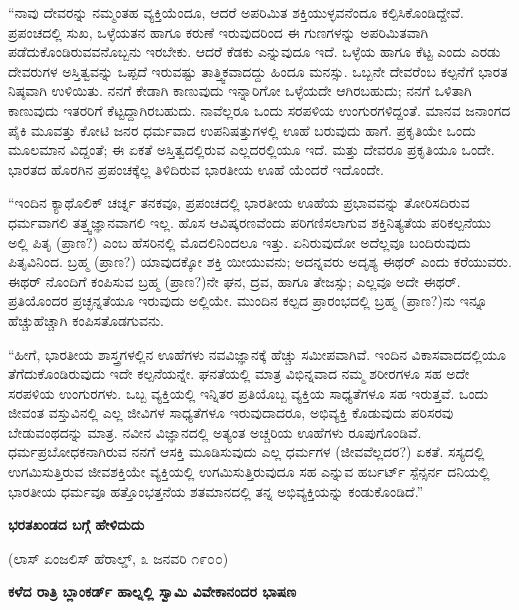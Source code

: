 “ನಾವು ದೇವರನ್ನು ನಮ್ಮಂತಹ ವ್ಯಕ್ತಿಯೆಂದೂ, ಆದರೆ ಅಪರಿಮಿತ ಶಕ್ತಿಯುಳ್ಳವನೆಂದೂ ಕಲ್ಪಿಸಿಕೊಂಡಿದ್ದೇವೆ. ಪ್ರಪಂಚದಲ್ಲಿ ಸುಖ, ಒಳ್ಳೆಯತನ ಹಾಗೂ ಕರುಣೆ ಇರುವುದರಿಂದ ಈ ಗುಣಗಳನ್ನು ಅಪರಿಮಿತವಾಗಿ ಪಡೆದುಕೊಂಡಿರುವವನೊಬ್ಬನು ಇರಬೇಕು. ಆದರೆ ಕೆಡಕು ಎನ್ನುವುದೂ ಇದೆ. ಒಳ್ಳೆಯ ಹಾಗೂ ಕೆಟ್ಟ ಎಂದು ಎರಡು ದೇವರುಗಳ ಅಸ್ತಿತ್ವವನ್ನು ಒಪ್ಪದೆ ಇರುವಷ್ಟು ತಾತ್ತ್ವಿಕವಾದದ್ದು ಹಿಂದೂ ಮನಸ್ಸು. ಒಬ್ಬನೇ ದೇವರೆಂಬ ಕಲ್ಪನೆಗೆ ಭಾರತ ನಿಷ್ಠವಾಗಿ ಉಳಿಯಿತು. ನನಗೆ ಕೇಡಾಗಿ ಕಾಣುವುದು ಇನ್ನಾರಿಗೋ ಒಳ್ಳೆಯದೇ ಆಗಿರಬಹುದು; ನನಗೆ ಒಳಿತಾಗಿ ಕಾಣುವುದು ಇತರರಿಗೆ ಕೆಟ್ಟದ್ದಾಗಿರಬಹುದು. ನಾವೆಲ್ಲರೂ ಒಂದು ಸರಪಳಿಯ ಉಂಗುರಗಳಿದ್ದಂತೆ. ಮಾನವ ಜನಾಂಗದ ಪೈಕಿ ಮೂವತ್ತು ಕೋಟಿ ಜನರ ಧರ್ಮವಾದ ಉಪನಿಷತ್ತುಗಳಲ್ಲಿ ಊಹೆ ಬರುವುದು ಹಾಗೆ. ಪ್ರಕೃತಿಯೇ ಒಂದು ಮೂಲಮಾನ ವಿದ್ದಂತೆ; ಈ ಏಕತೆ ಅಸ್ತಿತ್ವದಲ್ಲಿರುವ ಎಲ್ಲದರಲ್ಲಿಯೂ ಇದೆ. ಮತ್ತು ದೇವರೂ ಪ್ರಕೃತಿಯೂ ಒಂದೇ. ಭಾರತದ ಹೊರಗಿನ ಪ್ರಪಂಚಕ್ಕೆಲ್ಲ ತಿಳಿದಿರುವ ಭಾರತೀಯ ಊಹೆ ಯೆಂದರೆ ಇದೊಂದೇ.

“ಇಂದಿನ ಕ್ಯಾಥೊಲಿಕ್ ಚರ್ಚ್ನ ತನಕವೂ, ಪ್ರಪಂಚದಲ್ಲಿ ಭಾರತೀಯ ಊಹೆಯ ಪ್ರಭಾವವನ್ನು ತೋರಿಸದಿರುವ ಧರ್ಮವಾಗಲಿ ತತ್ತ್ವಜ್ಞಾನವಾಗಲಿ ಇಲ್ಲ. ಹೊಸ ಆವಿಷ್ಕರಣವೆಂದು ಪರಿಗಣಿಸಲಾಗುವ ಶಕ್ತಿನಿತ್ಯತೆಯ ಪರಿಕಲ್ಪನೆಯು ಅಲ್ಲಿ ಪಿತೃ (ಪ್ರಾಣ?) ಎಂಬ ಹೆಸರಿನಲ್ಲಿ ಮೊದಲಿನಿಂದಲೂ ಇತ್ತು. ಏನಿರುವುದೋ ಅದೆಲ್ಲವೂ ಬಂದಿರುವುದು ಪಿತೃವಿನಿಂದ. ಬ್ರಹ್ಮ (ಪ್ರಾಣ?) ಯಾವುದಕ್ಕೋ ಶಕ್ತಿ ಯೀಯುವನು; ಅದನ್ನವರು ಅದೃಶ್ಯ ಈಥರ್ ಎಂದು ಕರೆಯುವರು. ಈಥರ್ ನೊಂದಿಗೆ ಕಂಪಿಸುವ ಬ್ರಹ್ಮ (ಪ್ರಾಣ?)ನೇ ಘನ, ದ್ರವ, ಹಾಗೂ ತೇಜಸ್ಸು; ಎಲ್ಲವೂ ಅದೇ ಈಥರ್. ಪ್ರತಿಯೊಂದರ ಪ್ರಚ್ಛನ್ನತೆಯೂ ಇರುವುದು ಅಲ್ಲಿಯೇ. ಮುಂದಿನ ಕಲ್ಪದ ಪ್ರಾರಂಭದಲ್ಲಿ ಬ್ರಹ್ಮ (ಪ್ರಾಣ?)ನು ಇನ್ನೂ ಹೆಚ್ಚುಹೆಚ್ಚಾಗಿ ಕಂಪಿಸತೊಡಗುವನು.

“ಹೀಗೆ, ಭಾರತೀಯ ಶಾಸ್ತ್ರಗಳಲ್ಲಿನ ಊಹೆಗಳು ನವವಿಜ್ಞಾನಕ್ಕೆ ಹೆಚ್ಚು ಸಮೀಪವಾಗಿವೆ. ಇಂದಿನ ವಿಕಾಸವಾದದಲ್ಲಿಯೂ ತೆಗೆದುಕೊಂಡಿರುವುದು ಇದೇ ಕಲ್ಪನೆಯನ್ನೇ. ಘನತೆಯಲ್ಲಿ ಮಾತ್ರ ವಿಭಿನ್ನವಾದ ನಮ್ಮ ಶರೀರಗಳೂ ಸಹ ಅದೇ ಸರಪಳಿಯ ಉಂಗುರಗಳು. ಒಬ್ಬ ವ್ಯಕ್ತಿಯಲ್ಲಿ ಇನ್ನಿತರ ಪ್ರತಿಯೊಬ್ಬ ವ್ಯಕ್ತಿಯ ಸಾಧ್ಯತೆಗಳೂ ಸಹ ಇರುತ್ತವೆ. ಒಂದು ಜೀವಂತ ವಸ್ತುವಿನಲ್ಲಿ ಎಲ್ಲ ಜೀವಿಗಳ ಸಾಧ್ಯತೆಗಳೂ ಇರುವುದಾದರೂ, ಅಭಿವ್ಯಕ್ತಿ ಕೊಡುವುದು ಪರಿಸರವು ಬೇಡುವಂಥದನ್ನು ಮಾತ್ರ. ನವೀನ ವಿಜ್ಞಾನದಲ್ಲಿ ಅತ್ಯಂತ ಅಚ್ಚರಿಯ ಊಹೆಗಳು ರೂಪುಗೊಂಡಿವೆ. ಧರ್ಮಪ್ರಬೋಧಕನಾಗಿರುವ ನನಗೆ ಆಸಕ್ತಿ ಮೂಡಿಸುವುದು ಎಲ್ಲ ಧರ್ಮಗಳ (ಜೀವವೆಲ್ಲದರ?) ಏಕತೆ. ಸಸ್ಯದಲ್ಲಿ ಉಗಮಿಸುತ್ತಿರುವ ಜೀವಶಕ್ತಿಯೇ ವ್ಯಕ್ತಿಯಲ್ಲಿ ಉಗಮಿಸುತ್ತಿರುವುದೂ ಸಹ ಎನ್ನುವ ಹರ್ಬರ್ಟ್ ಸ್ಪೆನ್ಸರ್ನ ದನಿಯಲ್ಲಿ ಭಾರತೀಯ ಧರ್ಮವೂ ಹತ್ತೊಂಭತ್ತನೆಯ ಶತಮಾನದಲ್ಲಿ ತನ್ನ ಅಭಿವ್ಯಕ್ತಿಯನ್ನು ಕಂಡುಕೊಂಡಿದೆ.”

\begin{center}
\textbf{ಭರತಖಂಡದ ಬಗ್ಗೆ ಹೇಳಿದುದು}
\end{center}

\begin{center}
(ಲಾಸ್ ಏಂಜಲಿಸ್ ಹೆರಾಲ್ಡ್, ೩ ಜನವರಿ ೧೯೦೦)
\end{center}

\begin{center}
\textbf{ಕಳೆದ ರಾತ್ರಿ ಬ್ಲಾಂಕರ್ಡ್ ಹಾಲ್ನಲ್ಲಿ ಸ್ವಾಮಿ ವಿವೇಕಾನಂದರ ಭಾಷಣ}
\end{center}

